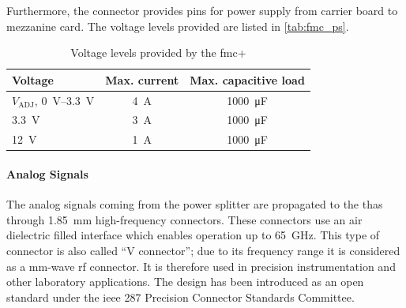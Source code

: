 Furthermore, the connector provides pins for power supply from carrier board to mezzanine card. \cite{fmc} The voltage levels provided are listed in \autoref{tab:fmc_ps}.

\begin{table}[tb]
	\caption[FMC+ Voltages]{Voltage levels provided by the \gls{fmc}+}
	\label{tab:fmc_ps}
		\centering
		\begin{tabularx}{\textwidth}{Xcc}
			\toprule
			\textbf{Voltage} & \textbf{Max. current} & \textbf{Max. capacitive load}\\
			\midrule
			$V_\text{ADJ}$, \SIrange{0}{3.3}{\volt} & \SI{4}{\ampere} & \SI{1000}{\micro \farad}\\
			\SI{3.3}{\volt} & \SI{3}{\ampere} & \SI{1000}{\micro \farad}\\
			\SI{12}{\volt} & \SI{1}{\ampere} & \SI{1000}{\micro \farad}\\
			\bottomrule
		\end{tabularx}
\end{table}

\paragraph{Analog Signals}
The analog signals coming from the power splitter are propagated to the \glspl{tha} through \SI{1.85}{\mm} high-frequency connectors. 
These connectors use an air dielectric filled interface which enables operation up to \SI{65}{\GHz}. 
This type of connector is also called ``V connector''; due to its frequency range it is considered as a mm-wave \gls{rf} connector.
It is therefore used in precision instrumentation and other laboratory applications.
The design has been introduced as an open standard under the \gls{ieee} 287 Precision Connector Standards Committee.

